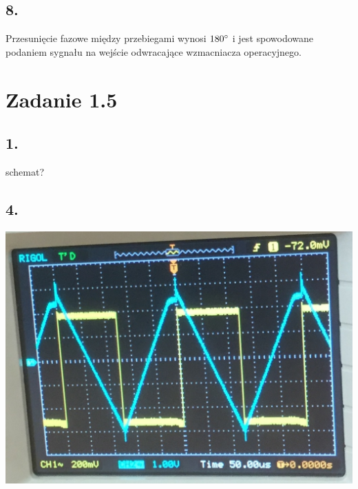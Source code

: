 \documentclass[polish,a4paper]{article}
\begin{document}
\subsection*{8.}
Przesunięcie fazowe między przebiegami wynosi $180\degree$ i jest spowodowane podaniem sygnału na wejście odwracające wzmacniacza operacyjnego.


\section{Zadanie 1.5}

\subsection*{1.}
schemat?
\subsection*{4.}
\includegraphics[scale=0.5]{przebieg_trojkatny}
\end{document}
